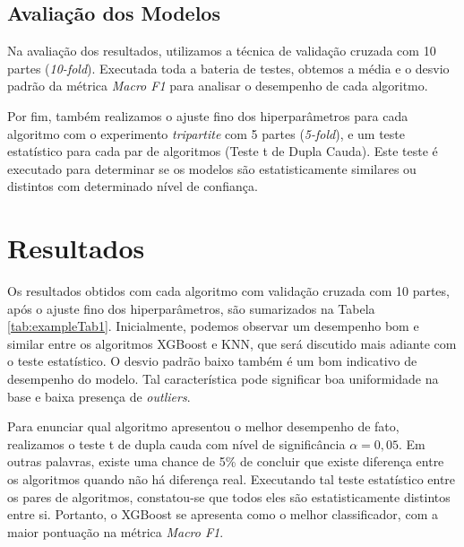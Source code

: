 \documentclass[manuscript,screen,review]{acmart}
\begin{document}
\subsection{Avaliação dos Modelos}

Na avaliação dos resultados, utilizamos a técnica de validação cruzada com 10 partes (\emph{10-fold}). Executada toda a bateria de testes, obtemos a média e o desvio padrão da métrica \emph{Macro F1} para analisar o desempenho de cada algoritmo.

Por fim, também realizamos o ajuste fino dos hiperparâmetros para cada algoritmo com o experimento \emph{tripartite} com 5 partes (\emph{5-fold}), e um teste estatístico para cada par de algoritmos (Teste t de Dupla Cauda). Este teste é executado para determinar se os modelos são estatisticamente similares ou distintos com determinado nível de confiança. 

\section{Resultados} \label{sec:4}

Os resultados obtidos com cada algoritmo com validação cruzada com 10 partes, após o ajuste fino dos hiperparâmetros, são sumarizados na Tabela \ref{tab:exampleTab1}. Inicialmente, podemos observar um desempenho bom e similar entre os algoritmos XGBoost e KNN, que será discutido mais adiante com o teste estatístico. O desvio padrão baixo também é um bom indicativo de desempenho do modelo. Tal característica pode significar boa uniformidade na base e baixa presença de \emph{outliers}.

\begin{table}[H]
    \centering
    \caption{\emph{Macro F1 Scores} alcançadas pelos algoritmos}
    \label{tab:exampleTab1}
    \vspace{0.2cm}
\end{table}

Para enunciar qual algoritmo apresentou o melhor desempenho de fato, realizamos o teste t de dupla cauda com nível de significância \(\alpha = 0,05\). Em outras palavras, existe uma chance de 5\% de concluir que existe diferença entre os algoritmos quando não há diferença real. Executando tal teste estatístico entre os pares de algoritmos, constatou-se que todos eles são estatisticamente distintos entre si. Portanto, o XGBoost se apresenta como o melhor classificador, com a maior pontuação na métrica \emph{Macro F1}.
\end{document}
